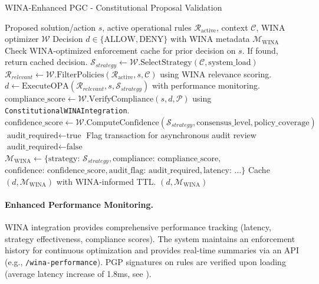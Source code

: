 \documentclass[manuscript,screen,9pt]{acmart}
\begin{document}
\begin{algorithm}[!htb]
\caption{WINA-Enhanced PGC - Constitutional Proposal Validation}
\label{alg:wina_pgc_validation}
\begin{algorithmic}[1]
\Require Proposed solution/action $s$, active operational rules $\mathcal{R}_{\text{active}}$, context $\mathcal{C}$, WINA optimizer $\mathcal{W}$
\Ensure Decision $d \in \{\text{ALLOW}, \text{DENY}\}$ with WINA metadata $\mathcal{M}_{\text{WINA}}$
    \State Check WINA-optimized enforcement cache for prior decision on $s$. If found, return cached decision.
    \State $\mathcal{S}_{strategy} \gets \mathcal{W}.\text{SelectStrategy}(\mathcal{C}, \text{system\_load})$
    \State $\mathcal{R}_{relevant} \gets \mathcal{W}.\text{FilterPolicies}(\mathcal{R}_{\text{active}}, s, \mathcal{C})$ using WINA relevance scoring.
    \State $d \gets \text{ExecuteOPA}(\mathcal{R}_{relevant}, s, \mathcal{S}_{strategy})$ with performance monitoring.
    \State $\text{compliance\_score} \gets \mathcal{W}.\text{VerifyCompliance}(s, d, \mathcal{P})$ using \texttt{ConstitutionalWINAIntegration}.
    \State $\text{confidence\_score} \gets \mathcal{W}.\text{ComputeConfidence}(\mathcal{S}_{strategy}, \text{consensus\_level}, \text{policy\_coverage})$
        \State $\text{audit\_required} \gets \text{true}$
        \State Flag transaction for asynchronous audit review
    \Else
        \State $\text{audit\_required} \gets \text{false}$
    \EndIf
    \State $\mathcal{M}_{\text{WINA}} \gets \{\text{strategy: } \mathcal{S}_{strategy}, \text{compliance: } \text{compliance\_score},$
    \State \hspace{2em} $\text{confidence: } \text{confidence\_score}, \text{audit\_flag: } \text{audit\_required}, \text{latency: } \dots \}$
    \State Cache $(d, \mathcal{M}_{\text{WINA}})$ with WINA-informed TTL.
    \State \Return $(d, \mathcal{M}_{\text{WINA}})$
\EndFunction
\end{algorithmic}
\end{algorithm}

\paragraph{Enhanced Performance Monitoring.} WINA integration provides comprehensive performance tracking (latency, strategy effectiveness, compliance scores). The system maintains an enforcement history for continuous optimization and provides real-time summaries via an API (e.g., \texttt{/wina-performance}). PGP signatures on rules are verified upon loading (average latency increase of 1.8ms, see ).
\end{document}
